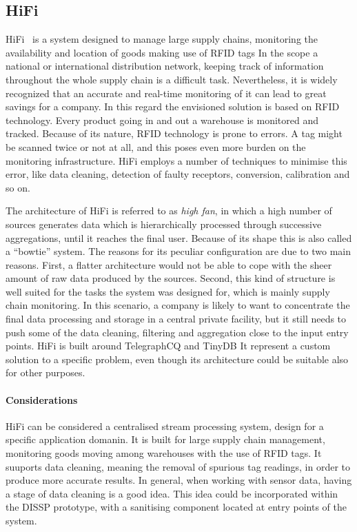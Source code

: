 \subsection*{HiFi}
\label{sec:hifi}

HiFi~\cite{hifi} is a system designed to manage large supply chains, monitoring the availability and location of goods
making use of RFID tags In the scope a national or international distribution network, keeping track of information
throughout the whole supply chain is a difficult task. Nevertheless, it is widely recognized that an accurate and
real-time monitoring of it can lead to great savings for a company. In this regard the envisioned solution is based on
RFID technology. Every product going in and out a warehouse is monitored and tracked. Because of its nature, RFID
technology is prone to errors. A tag might be scanned twice or not at all, and this poses even more burden on the
monitoring infrastructure. HiFi employs a number of techniques to minimise this error, like data cleaning, detection of
faulty receptors, conversion, calibration and so on. 

The architecture of HiFi is referred to as \emph{high fan}, in which a high number of sources generates data which is
hierarchically processed through successive aggregations, until it reaches the final user. Because of its shape this is
also called a ``bowtie'' system. The reasons for its peculiar configuration are due to two main reasons. First, a
flatter architecture would not be able to cope with the sheer amount of raw data produced by the sources.  Second, this
kind of structure is well suited for the tasks the system was designed for, which is mainly supply chain monitoring. In
this scenario, a company is likely to want to concentrate the final data processing and storage in a central private
facility, but it still needs to push some of the data cleaning, filtering and aggregation close to the input entry
points.  HiFi is built around TelegraphCQ\cite{telegraphcq} and TinyDB\cite{tinydb} It represent a custom solution to a
specific problem, even though its architecture could be suitable also for other purposes.

\paragraph{Considerations}
HiFi can be considered a centralised stream processing system, design for a specific application domanin.
It is built for large supply chain management, monitoring goods moving among warehouses with the use of RFID tags.
It suuports data cleaning, meaning the removal of spurious tag readings, in order to produce more accurate results.
In general, when working with sensor data, having a stage of data cleaning is a good idea. This idea could be
incorporated within the DISSP prototype, with a sanitising component located at entry points of the system.
